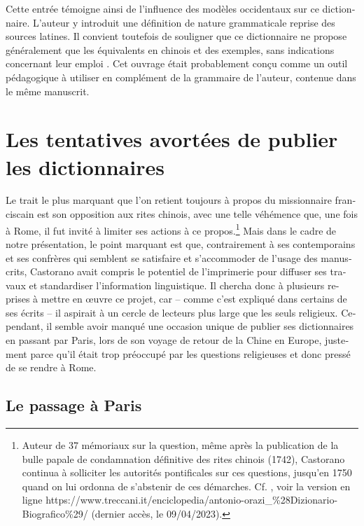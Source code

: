\documentclass[output=paper,colorlinks,citecolor=brown,arabicfont,chinesefont,booklanguage=french]{langscibook}
\begin{document}
\begin{otherlanguage}{french}
Cette entrée témoigne ainsi de l’influence des modèles occidentaux sur ce dictionnaire. L’auteur y introduit une définition de nature grammaticale reprise des sources latines. Il convient toutefois de souligner que ce dictionnaire ne propose généralement que les équivalents en chinois et des exemples, sans indications concernant leur emploi \citet[185]{Li2017}. Cet ouvrage était probablement conçu comme un outil pédagogique à utiliser en complément de la grammaire de l’auteur, contenue dans le même manuscrit.

\section{Les tentatives avortées de publier les dictionnaires}

Le trait le plus marquant que l’on retient toujours à propos du missionnaire franciscain est son opposition aux rites chinois, avec une telle véhémence que, une fois à Rome, il fut invité à limiter ses actions à ce propos.\footnote{Auteur de 37 mémoriaux sur la question, même après la publication de la bulle papale de condamnation définitive des rites chinois (1742), Castorano continua à solliciter les autorités pontificales sur ces questions, jusqu’en 1750 quand on lui ordonna de s’abstenir de ces démarches. Cf. \citet{Catto2013}, voir la version en ligne https://www.treccani.it/enciclopedia/antonio-orazi\_\%28Dizionario-Biografico\%29/ (dernier accès, le 09/04/2023).} Mais dans le cadre de notre présentation, le point marquant est que, contrairement à ses contemporains et ses confrères qui semblent se satisfaire et s’accommoder de l’usage des manuscrits, Castorano avait compris le potentiel de l’imprimerie pour diffuser ses travaux et standardiser l’information linguistique. Il chercha donc à plusieurs reprises à mettre en œuvre ce projet, car – comme c’est expliqué dans certains de ses écrits – il aspirait à un cercle de lecteurs plus large que les seuls religieux. Cependant, il semble avoir manqué une occasion unique de publier ses dictionnaires en passant par Paris, lors de son voyage de retour de la Chine en Europe, justement parce qu’il était trop préoccupé par les questions religieuses et donc pressé de se rendre à Rome.

\subsection{Le passage à Paris}


\end{otherlanguage}
\end{document}
